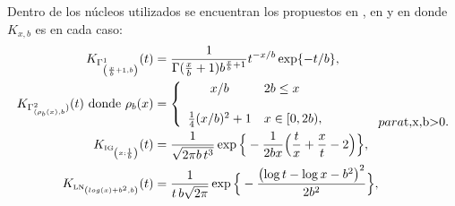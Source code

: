 Dentro de los núcleos utilizados se encuentran los propuestos en \citet{chensx2000}, en \citet{Libnegue2013} y en \citet{bouezmarni2005} donde $K_{x,b}$ es en cada caso: 
\begin{subequations}
	\label{NucleosAsimetricosUsados}
	\begin{align}
	K_{\tiny \Gamma^1_{\left(\frac{x}{b}+1,b\right)}}(t) & =\frac{1}{\Gamma(\frac{x}{b}+1)b^{\frac{x}{b}+1}} t^{-{x}/{b}} \exp\{-{t}/{b}\},
	\label{gammakernel}\\
	K_{\tiny \Gamma^2_{({\rho}_b(x),b})}(t) \text{ donde }
	\rho_b (x)&= \left\{
	\begin{array}{c l}
	x/b & 2 b \leq  x \\
	\\
	\frac{1}{4}(x/b)^2+1 & x \in [0,2 b),\\
	\end{array}
	\right.
	\label{gammakernel2}\\
	K_{\text{\tiny IG}_{\left( x;\frac{1}{b}\right)}}(t) & =\frac{1}{\sqrt{2\pi b \, t^3}} 
	\exp\Big\{-\frac{1}{2b x} \Big(\frac{t}{x}+\frac{x}{t}-2\Big)\Big\},
	\label{IGkernel}\\
	K_{{\text{\tiny LN}}_{\left(log(x)+b^2,b \right)}}(t) & =\frac{1}{t\,b \sqrt{2 \pi}} \exp\Big\{-\frac{\left(\log t - \log x -b^2\right)^2}{2b^2}\Big\},
	\label{LNkernel}
	\end{align}
	para $t,x,b>0$.
\end{subequations}

